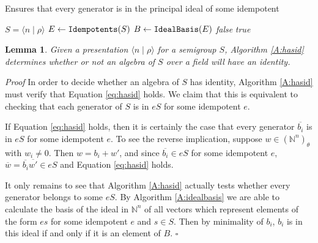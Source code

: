 \documentclass{acmconf}
\def\N{{\mathbb{N}}}
\newtheorem{lemma}{Lemma}
\begin{document}
\begin{algorithm}
\caption{Ensures that every generator is in the principal 
ideal of some idempotent}
\label{A:hasid}
\begin{algorithmic}[1]
\REQUIRE $S = \langle n \mid \rho\rangle$ 
\STATE $E \leftarrow {\mbox{\tt Idempotents}}(S)$ \label{l:calcidemps} 
\STATE $B \leftarrow {\mbox{\tt IdealBasis}}(E)$ \label{l:unionbasis}
 \emph{false}
\ELSE
{} \emph{true}
\ENDIF
\end{algorithmic}
\end{algorithm}

\begin{lemma}\label{L:hasid}
Given a presentation $\langle n \mid \rho\rangle$ for a semigroup 
$S$, Algorithm \ref{A:hasid} determines whether or not
an algebra of $S$ over a field will have an identity.
\end{lemma}
\emph{Proof}
In order to decide whether an algebra of $S$ has identity,
Algorithm \ref{A:hasid}
must verify that Equation \ref{eq:hasid} holds. 
We claim that this is equivalent to checking that 
each generator of $S$ is in $eS$ for some idempotent $e$.

If Equation \ref{eq:hasid} holds, then it is certainly the case
that every generator $\overline{b_i}$ is in $eS$ for some 
idempotent $e$. To see the
reverse implication,  suppose $w \in (\mathbb{N}^n)_\theta$ with
$w_i \neq 0$. Then $w = b_i + w'$, and since $\overline{b_i} \in eS$ for some
idempotent $e$, $\overline{w} = \overline{b_i}\overline{w'} \in eS$
and Equation  \ref{eq:hasid} holds.



It only remains to see that Algorithm \ref{A:hasid} actually tests
whether every generator belongs to some $eS$. By Algorithm \ref{A:idealbasis}
we are able to calculate the basis of the ideal in $\N^n$ of  all
vectors which represent elements of the form $es$ for some idempotent
$e$ and $s \in S$. Then by minimality of $b_i$, $b_i$ is in this ideal
if and only if it is an element of $B$.  $\square$

\end{document}
